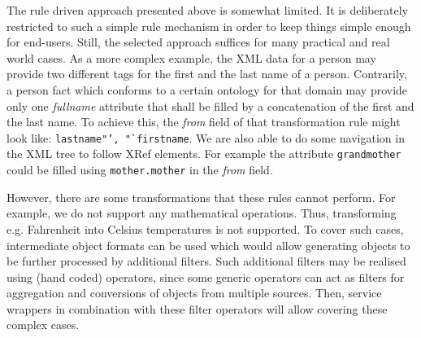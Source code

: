 The rule driven approach presented above is somewhat limited. It is deliberately restricted to such a simple rule mechanism in order to keep things simple enough for end-users. Still, the selected approach suffices for many practical and real world cases. As a more complex example, the XML data for a person may provide two different tags for the first and the last name of a person. Contrarily, a person fact which conforms to a certain ontology for that domain may provide only one \emph{fullname} attribute that shall be filled by a concatenation of the first and the last name. To achieve this, the \textit{from} field of that transformation rule might look like: \texttt{lastname"', "`firstname}. We are also able to do some navigation in the XML tree to follow XRef elements. For example the attribute \texttt{grandmother} could be filled using \texttt{mother.mother} in the \textit{from} field. 

However, there are some transformations that these rules cannot perform. For example, we do not support any mathematical operations. Thus, transforming e.g. Fahrenheit into Celsius temperatures is not supported. To cover such  cases, intermediate object formats can be used which would allow generating objects to be further processed by additional filters. Such additional filters may be realised using (hand coded) operators, since some generic operators can act as filters for aggregation and conversions of objects from multiple sources. Then, service wrappers in combination with these filter operators will allow covering these complex cases.



